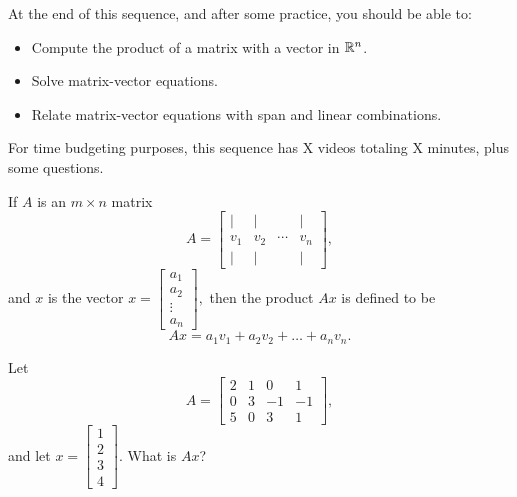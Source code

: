 







At the end of this sequence, and after some practice, you should be able to:

\begin{itemize}
\item Compute the product of a matrix with a vector in $\mathbb R^n$.   
\item Solve matrix-vector equations.
\item Relate matrix-vector equations with span and linear combinations.  
\end{itemize}


For time budgeting purposes, this sequence has X videos totaling X minutes, 
plus some questions.  




\endedxtext

\endedxvertical






If $A$ is an $m\times n$ matrix
\[ A = \left[ \begin{array}{cccc} | & | & & | \\ 
v_1 & v_2 & \cdots & v_n \\
 | & | & & | \end{array} \right], \] and $x$ is the vector $x = \left[\begin{array}{c} a_1 \\ a_2 \\ \vdots \\ a_n
\end{array} \right],$ then 
the product $Ax$ is defined to be 
\[ Ax = a_1 v_1 + a_2 v_2 + \ldots + a_n v_n.\]


\endedxtext

\endedxvertical








Let  \[A = \left[ \begin{array}{cccc} 2 & 1 & 0 & 1\\ 
0 & 3 & -1 & -1 \\
5 & 0 & 3 & 1 \end{array} \right] ,\]
and let $x = \left[\begin{array}{c} 1 \\ 2 \\ 3 \\4
\end{array} \right].$  What is $Ax$?  

